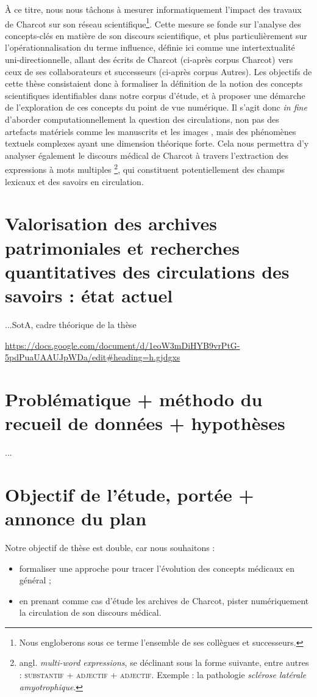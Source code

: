 À ce titre, nous nous tâchons à mesurer informatiquement l'impact des travaux de Charcot sur son réseau scientifique\footnote{Nous engloberons sous ce terme l'ensemble de ses collègues et successeurs.}. Cette mesure se fonde sur l'analyse des concepts-clés en matière de son discours scientifique, et plus particulièrement sur l'opérationnalisation du terme \og{}influence\fg{}, définie ici comme une intertextualité uni-directionnelle, allant des écrits de Charcot (ci-après corpus \og{}Charcot\fg{}) vers ceux de ses collaborateurs et successeurs (ci-après corpus \og{}Autres\fg{}). Les objectifs de cette thèse consistaient donc à formaliser la définition de la notion des concepts scientifiques identifiables dans notre corpus d'étude, et à proposer une démarche de l'exploration de ces concepts du point de vue numérique. Il s'agit donc \textit{in fine} d'aborder computationnellement la question des circulations, non pas des artefacts matériels comme les manuscrits \citep{gabay2021katabase} et les images \citep{joyeux2019visual}, mais des phénomènes textuels complexes \citep{manjavacas} ayant une dimension théorique forte. Cela nous permettra d'y analyser également le discours médical de Charcot à travers l'extraction des expressions à mots multiples \citep[p. 96]{nerima2006}\footnote{angl. \textit{multi-word expressions}, se déclinant sous la forme suivante, entre autres : \textsc{substantif + adjectif + adjectif}. Exemple : la pathologie \textit{sclérose latérale amyotrophique}.}, qui constituent potentiellement des champs lexicaux et des savoirs en circulation.






\section{Valorisation des archives patrimoniales et recherches quantitatives des circulations des savoirs : état actuel}
...SotA, cadre théorique de la thèse

\url{https://docs.google.com/document/d/1eoW3mDiHYB9vrPtG-5pdPuaUAAUJpWDa/edit\#heading=h.gjdgxs}
\section{Problématique + méthodo du recueil de données + hypothèses}
...
\section{Objectif de l'étude, portée + annonce du plan}
Notre objectif de thèse est double, car nous souhaitons :
\begin{itemize} 
	\item formaliser une approche pour tracer l'évolution des concepts médicaux en général ;
	\item en prenant comme cas d'étude les archives de Charcot, pister numériquement la circulation de son discours médical.
\end{itemize}

